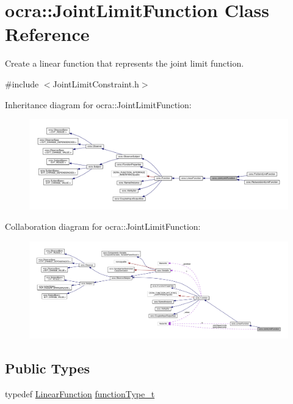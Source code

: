 \hypertarget{classocra_1_1JointLimitFunction}{}\section{ocra\+:\+:Joint\+Limit\+Function Class Reference}
\label{classocra_1_1JointLimitFunction}


Create a linear function that represents the joint limit function.  




{\ttfamily \#include $<$Joint\+Limit\+Constraint.\+h$>$}



Inheritance diagram for ocra\+:\+:Joint\+Limit\+Function\+:\nopagebreak
\begin{figure}[H]
\begin{center}
\leavevmode
\includegraphics[width=350pt]{d9/dee/classocra_1_1JointLimitFunction__inherit__graph}
\end{center}
\end{figure}


Collaboration diagram for ocra\+:\+:Joint\+Limit\+Function\+:\nopagebreak
\begin{figure}[H]
\begin{center}
\leavevmode
\includegraphics[width=350pt]{d9/dbd/classocra_1_1JointLimitFunction__coll__graph}
\end{center}
\end{figure}
\subsection*{Public Types}
\begin{DoxyCompactItemize}
\item 
typedef \hyperlink{classocra_1_1LinearFunction}{Linear\+Function} \hyperlink{classocra_1_1JointLimitFunction_af300f2c709840b94759c445130ec9a18}{function\+Type\+\_\+t}
\end{DoxyCompactItemize}
